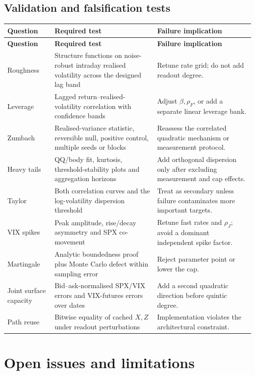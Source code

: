 \documentclass[11pt,a4paper]{article}
\begin{document}
\subsection{Validation and falsification tests}

\begin{longtable}{@{}L{38mm}L{52mm}L{52mm}@{}}
\toprule
\textbf{Question} & \textbf{Required test} & \textbf{Failure implication} \\
\midrule
\endfirsthead
\toprule
\textbf{Question} & \textbf{Required test} & \textbf{Failure implication} \\
\midrule
\endhead
Roughness & Structure functions on noise-robust intraday realised volatility across the
designed lag band & Retune rate grid; do not add readout degree. \\
Leverage & Lagged return--realised-volatility correlation with confidence bands & Adjust
\(\beta,\rho_F\), or add a separate linear leverage bank. \\
Zumbach & Realised-variance statistic, reversible null, positive control, multiple seeds or
blocks & Reassess the correlated quadratic mechanism or measurement protocol. \\
Heavy tails & QQ/body fit, kurtosis, threshold-stability plots and aggregation horizons & Add
orthogonal dispersion only after excluding measurement and cap effects. \\
Taylor & Both correlation curves and the log-volatility dispersion threshold & Treat as
secondary unless failure contaminates more important targets. \\
VIX spikes & Peak amplitude, rise/decay asymmetry and SPX co-movement & Retune fast rates and
\(\rho_J\); avoid a dominant independent spike factor. \\
Martingale & Analytic boundedness proof plus Monte Carlo defect within sampling error & Reject
parameter point or lower the cap. \\
Joint surface capacity & Bid--ask-normalised SPX/VIX errors and VIX-futures errors over dates &
Add a second quadratic direction before quintic degree. \\
Path reuse & Bitwise equality of cached \(X,Z\) under readout perturbations & Implementation
violates the architectural constraint. \\
\bottomrule
\end{longtable}

\section{Open issues and limitations}
\end{document}
